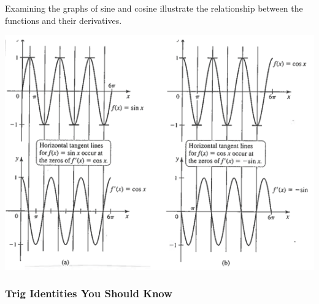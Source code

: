 \documentclass[cal1spr16Lectures.tex]{subfiles}
\begin{document}
\begin{frame}
Examining the graphs of sine and cosine illustrate the relationship between the functions and their derivatives.

\begin{center}
\includegraphics[scale=0.9]{pictures/Ch3sineCosine}
\end{center}
\end{frame}

\subsubsection{Trig Identities You Should Know}
\end{document}
